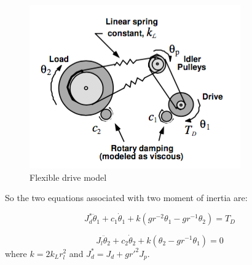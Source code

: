 \documentclass[a4paper, 12pt]{article}
\begin{document}
\begin{figure}[!htbp]
\centering
\includegraphics[scale = 0.7]{Dynamics}
\caption{Flexible drive model}
\label{flexible}
\end{figure}

So the two equations associated with two moment of inertia are:

\begin{equation} \label{flexible1}
J_d^* \ddot{\theta}_1 + c_1\dot{\theta}_1 + k(gr^{-2}\theta_1 - gr^{-1} \theta_2) = T_D
\end{equation}

\begin{equation} \label{flexible2}
J_l \ddot{\theta}_2 + c_2\dot{\theta}_2 + k(\theta_2 - gr^{-1}\theta_1) = 0
\end{equation}
where $k = 2k_L r_l^2$ and $J_d^* = J_d + gr'^2J_p$.
\end{document}
